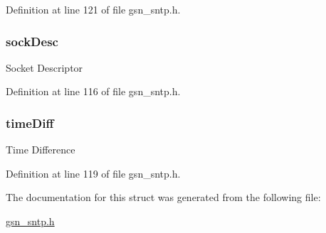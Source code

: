 Definition at line 121 of file gsn\_\-sntp.h.

\hypertarget{a00227_a4664a1e7fa506ea9a7864c6847d8af4b}{
\subsubsection[{sockDesc}]{ {\bf sockDesc}}}
\label{a00227_a4664a1e7fa506ea9a7864c6847d8af4b}
Socket Descriptor 

Definition at line 116 of file gsn\_\-sntp.h.

\hypertarget{a00227_aa1d801da8079e893c423290b7f12041d}{
\subsubsection[{timeDiff}]{ {\bf timeDiff}}}
\label{a00227_aa1d801da8079e893c423290b7f12041d}
Time Difference 

Definition at line 119 of file gsn\_\-sntp.h.



The documentation for this struct was generated from the following file:\begin{DoxyCompactItemize}
\item 
\hyperlink{a00585}{gsn\_\-sntp.h}\end{DoxyCompactItemize}
